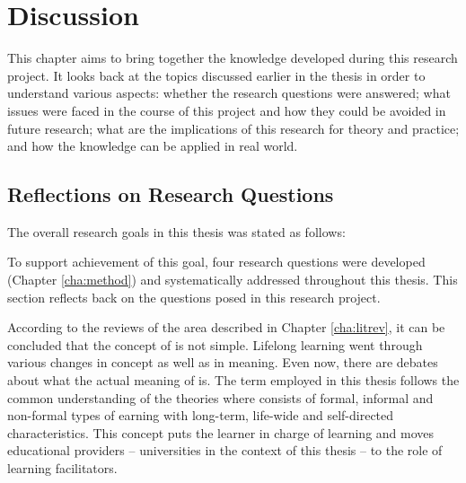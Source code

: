 \chapter{Discussion\label{cha:discussion}}
This chapter aims to bring together the knowledge developed during this research
project. It looks back at the topics discussed earlier in the thesis in order to
understand various aspects: whether the research questions were answered; what
issues were faced in the course of this project and how they could be avoided in
future research; what are the implications of this research for theory and
practice; and how the knowledge can be applied in real world.

\section{Reflections on Research Questions}

The overall research goals in this thesis was stated as follows:


To support achievement of this goal, four research questions were developed
(Chapter \ref{cha:method}) and systematically addressed throughout this thesis.
This section reflects back on the questions posed in this research project.


According to the reviews of the area described in Chapter \ref{cha:litrev}, it
can be concluded that the concept of \LLLs is not simple. Lifelong learning
went through various changes in concept as well as in meaning. Even now,
there are debates about what the actual meaning of \LLLs is. The term employed
in this thesis follows the common understanding of the theories where \LLLs
consists of formal, informal and non-formal types of  earning with long-term,
life-wide and self-directed characteristics. This concept puts the learner in
charge of learning and moves educational providers -- universities in the
context of this thesis -- to the role of learning facilitators.

